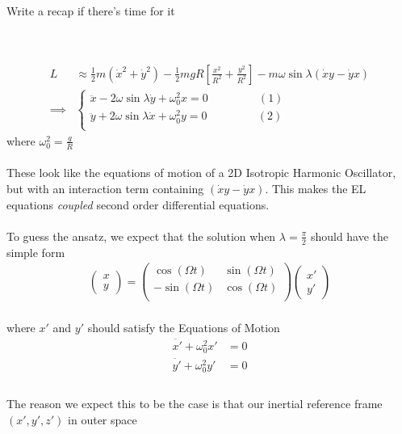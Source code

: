 \documentclass[11pt]{article}
\begin{document}
\begin{note}
  {Write a recap if there's time for it}
\end{note}
\\
\\
\begin{align*}
  L &\approx \frac{1}{2}m(\dot{x}^2 + \dot{y}^2) - \frac{1}{2}mgR \left[ \frac{x^2}{R^2} + \frac{y^2}{R^2} \right] - m\omega\sin\lambda (\dot{x} y - \dot{y} x) \\
  \implies& \begin{cases}
    \ddot{x} - 2\omega\sin\lambda \dot{y} + \omega_0^2 x = 0 \;\;\;\;\;\;\;\;\;\;\;\;\;\;\;\;(1)\\
    \ddot{y} + 2\omega\sin\lambda \dot{x} + \omega_0^2 y = 0 \;\;\;\;\;\;\;\;\;\;\;\;\;\;\;\;(2)\\
  \end{cases}
\end{align*}
where $\omega_0^2 = \frac{g}{R}$
\\
\\
These look like the equations of motion of a 2D Isotropic Harmonic Oscillator, but with an interaction term containing $(\dot{x}y - \dot{y}x)$. This makes the EL equations \emph{coupled} second order differential equations.
\\
\\
To guess the ansatz, we expect that the solution when $\lambda = \frac{\pi}{2}$ should have the simple form 
\begin{align*}
  \begin{pmatrix}
    x \\ y
  \end{pmatrix} = \begin{pmatrix}
    \cos(\Omega t) & \sin(\Omega t) \\
    -\sin(\Omega t) & \cos(\Omega t)  \\
  \end{pmatrix} \begin{pmatrix}
    x' \\ y'
  \end{pmatrix}
\end{align*}
\\
where $x'$ and $y'$ should satisfy the Equations of Motion 
\begin{align*}
  \ddot{x'} + \omega_0^2 x' &= 0 \\
  \ddot{y'} + \omega_0^2 y' &= 0 \\
\end{align*}
\\
The reason we expect this to be the case is that our inertial reference frame $(x', y', z')$ in outer space
\end{document}
